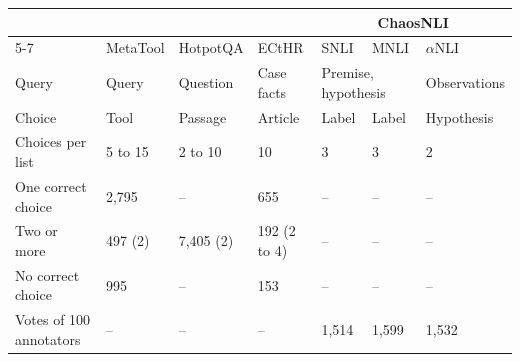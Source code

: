 \begin{tabular}{lllllll}
\toprule
 & & & & \multicolumn{3}{c}{ChaosNLI} \\
\cmidrule{5-7}
 & MetaTool & HotpotQA & ECtHR & SNLI & MNLI & $\alpha$NLI \\
\midrule
Query & Query & Question & Case facts & \multicolumn{2}{l}{Premise, hypothesis} & Observations \\
Choice & Tool & Passage & Article & Label & Label & Hypothesis \\
Choices per list & 5 to 15 & 2 to 10 & 10 & 3 & 3 & 2 \\
One correct choice & 2,795 & -- & 655 & -- & -- & -- \\
Two or more & 497 (2) & 7,405 (2) & 192 (2 to 4) & -- & -- & -- \\
No correct choice & 995 & -- & 153 & -- & -- & -- \\
Votes of 100 annotators & -- & -- & -- & 1,514 & 1,599 & 1,532 \\
\bottomrule
\end{tabular}%
